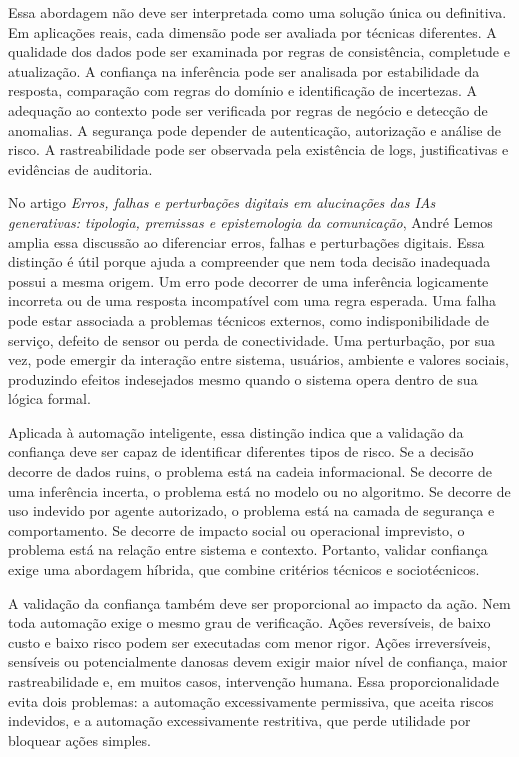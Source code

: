 \documentclass[12pt]{article}
\begin{document}
Essa abordagem não deve ser interpretada como uma solução única ou definitiva. Em aplicações reais, cada dimensão pode ser avaliada por técnicas diferentes. A qualidade dos dados pode ser examinada por regras de consistência, completude e atualização. A confiança na inferência pode ser analisada por estabilidade da resposta, comparação com regras do domínio e identificação de incertezas. A adequação ao contexto pode ser verificada por regras de negócio e detecção de anomalias. A segurança pode depender de autenticação, autorização e análise de risco. A rastreabilidade pode ser observada pela existência de logs, justificativas e evidências de auditoria.

No artigo \textit{Erros, falhas e perturbações digitais em alucinações das IAs generativas: tipologia, premissas e epistemologia da comunicação}, André Lemos \cite{lemos2024} amplia essa discussão ao diferenciar erros, falhas e perturbações digitais. Essa distinção é útil porque ajuda a compreender que nem toda decisão inadequada possui a mesma origem. Um erro pode decorrer de uma inferência logicamente incorreta ou de uma resposta incompatível com uma regra esperada. Uma falha pode estar associada a problemas técnicos externos, como indisponibilidade de serviço, defeito de sensor ou perda de conectividade. Uma perturbação, por sua vez, pode emergir da interação entre sistema, usuários, ambiente e valores sociais, produzindo efeitos indesejados mesmo quando o sistema opera dentro de sua lógica formal.

Aplicada à automação inteligente, essa distinção indica que a validação da confiança deve ser capaz de identificar diferentes tipos de risco. Se a decisão decorre de dados ruins, o problema está na cadeia informacional. Se decorre de uma inferência incerta, o problema está no modelo ou no algoritmo. Se decorre de uso indevido por agente autorizado, o problema está na camada de segurança e comportamento. Se decorre de impacto social ou operacional imprevisto, o problema está na relação entre sistema e contexto. Portanto, validar confiança exige uma abordagem híbrida, que combine critérios técnicos e sociotécnicos.

A validação da confiança também deve ser proporcional ao impacto da ação. Nem toda automação exige o mesmo grau de verificação. Ações reversíveis, de baixo custo e baixo risco podem ser executadas com menor rigor. Ações irreversíveis, sensíveis ou potencialmente danosas devem exigir maior nível de confiança, maior rastreabilidade e, em muitos casos, intervenção humana. Essa proporcionalidade evita dois problemas: a automação excessivamente permissiva, que aceita riscos indevidos, e a automação excessivamente restritiva, que perde utilidade por bloquear ações simples.
\end{document}
